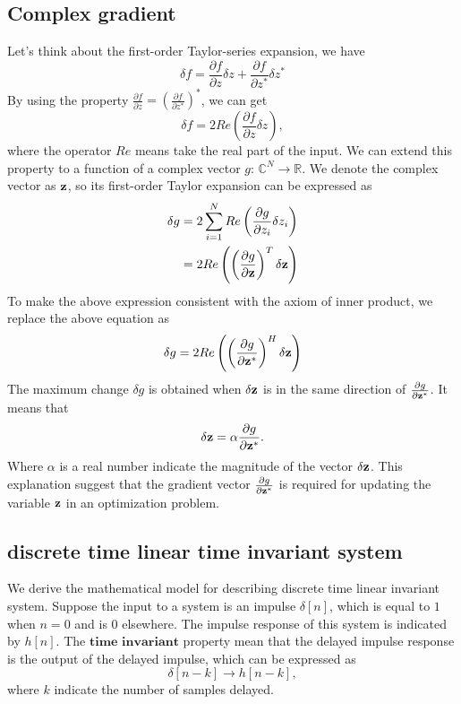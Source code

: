 \documentclass[revised,endfloat]{geophysics}
\begin{document}
\subsection{Complex gradient}
Let's think about the first-order Taylor-series expansion, we have 
\begin{equation}
\delta f = \frac{\partial f}{\partial z} \delta z +  \frac{\partial f}{\partial z^{\ast}} \delta z^{\ast} 
\end{equation}
By using the property $\frac{\partial f}{\partial z} = \left( \frac{\partial f}{\partial z^{\ast}} \right)^{\ast}$, we can get 
\begin{equation}
\delta f = 2 Re (\frac{\partial f}{\partial z} \delta z),
\end{equation}
where the operator $Re$ means take the real part of the input.
We can extend this property to a function of a complex vector $g$: $\mathbb{C}^N \rightarrow \mathbb{R}$. We denote the complex vector as $\bf z$, so its first-order Taylor expansion can be expressed as
\begin{equation}
\begin{split}
\delta g &= 2 \sum_{i=1}^N Re \left(\frac{\partial g}{\partial z_i} \delta z_i \right) \\
             &= 2 Re\left( \left( \frac{\partial g}{\partial {\bf z}} \right)^T {\bf \delta z} \right)
\end{split}
\end{equation}
To make the above expression consistent with the axiom of inner product, we replace the above equation as 
\begin{equation}
\delta g = 2 Re \left( \left( \frac{\partial g}{\partial {\bf z^{\ast}}}\right)^H {\bf \delta z} \right)
\end{equation}
The maximum change $\delta g$ is obtained when $\delta {\bf z}$ is in the same direction of $\frac{\partial g}{\partial {\bf z^{\ast}}}$. It means that
\begin{equation}
\delta {\bf z} = \alpha \frac{\partial g}{\partial {\bf z^{\ast}}}.
\end{equation}
Where $\alpha$ is a real number indicate the magnitude of the vector $\delta {\bf z}$. This explanation suggest that the gradient vector $ \frac{\partial g}{\partial {\bf z^{\ast}}}$ is required for updating the variable ${\bf z}$ in an optimization problem.

\subsection{discrete time linear time invariant system}
We derive the mathematical model for describing discrete time linear invariant system. Suppose the input to a system is an impulse $\delta[n]$, which is equal to $1$ when $n=0$ and is $0$ elsewhere. The impulse response of this system is indicated by $h[n]$. The $\textbf{time invariant}$ property mean that the delayed impulse response is the output of the delayed impulse, which can be expressed as 
\begin{equation}
\delta[n-k] \rightarrow h[n-k],
\end{equation}
where $k$ indicate the number of samples delayed.
\end{document}
